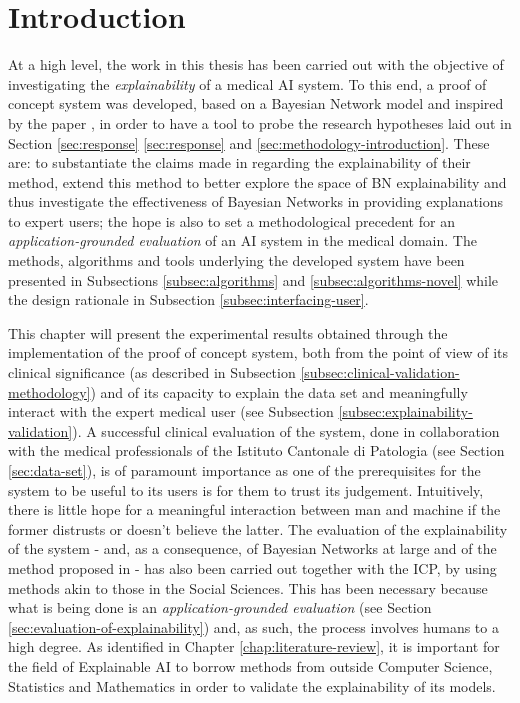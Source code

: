 \section{Introduction} \label{sec:introduction-results}
At a high level, the work in this thesis has been carried out with the objective of investigating the \textit{explainability} of a medical AI system.
To this end, a proof of concept system was developed, based on a Bayesian Network model and inspired by the paper \citep{Butz2018}, in order to have a tool to probe the research hypotheses laid out in Section \ref{sec:response} \ref{sec:response} and \ref{sec:methodology-introduction}.
These are: to substantiate the claims made in \citep{Butz2018} regarding the explainability of their method, extend this method to better explore the space of BN explainability and thus investigate the effectiveness of Bayesian Networks in providing explanations to expert users; the hope is also to set a methodological precedent for an \textit{application-grounded evaluation} of an AI system in the medical domain.
The methods, algorithms and tools underlying the developed system have been presented in Subsections \ref{subsec:algorithms} and \ref{subsec:algorithms-novel} while the design rationale in Subsection \ref{subsec:interfacing-user}. 

This chapter will present the experimental results obtained through the implementation of the proof of concept system, both from the point of view of its clinical significance (as described in Subsection \ref{subsec:clinical-validation-methodology}) and of its capacity to explain the data set and meaningfully interact with the expert medical user (see Subsection \ref{subsec:explainability-validation}).
A successful clinical evaluation of the system, done in collaboration with the medical professionals of the Istituto Cantonale di Patologia (see Section \ref{sec:data-set}), is of paramount importance as one of the prerequisites for the system to be useful to its users is for them to trust its judgement.
Intuitively, there is little hope for a meaningful interaction between man and machine if the former distrusts or doesn't believe the latter.
The evaluation of the explainability of the system - and, as a consequence, of Bayesian Networks at large and of the method proposed in \citep{Butz2018} - has also been carried out together with the ICP, by using methods akin to those in the Social Sciences.
This has been necessary because what is being done is an \textit{application-grounded evaluation} (see Section \ref{sec:evaluation-of-explainability}) and, as such, the process involves humans to a high degree.
As identified in Chapter \ref{chap:literature-review}, it is important for the field of Explainable AI to borrow methods from outside Computer Science, Statistics and Mathematics in order to validate the explainability of its models.

